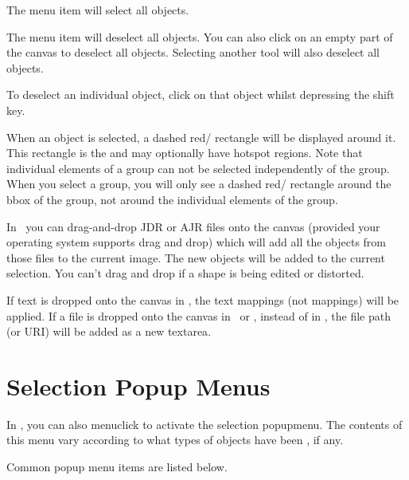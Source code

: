 The  menu item will select all
\glspl{object}.


The  menu item will deselect all
\glspl{object}. You can also click on
an empty part of the \gls{canvas} to deselect all \glspl{object}.
Selecting another tool will also deselect all \glspl*{object}.

\begin{information}
To deselect an individual \gls*{object}, click on that object whilst
depressing the shift  key.
\end{information}

When an \gls{object} is selected, a dashed red\slash{}
rectangle will be displayed around it. This rectangle is the 
\emph{} and may optionally have
\gls{hotspot} regions. Note that individual elements of a
\gls{group} can not be selected independently of the group.  When
you select a group, you will only see a dashed
red\slash{} rectangle around the \gls{bbox} of the group,
not around the individual elements of the group.

In \selectmode\ you can \gls{drag-and-drop} \gls{JDR} or \gls{AJR}
files onto the \gls{canvas} (provided your operating system supports
drag and drop) which will add all the objects from those files to
the current image. The new objects will be added to the current
selection. You can't drag and drop if a shape is being edited or
distorted.

If text is dropped onto the \gls{canvas} in \selectmode, the text
mappings (not  mappings) will be applied. If a file is
dropped onto the \gls{canvas} in \textmode\ or \mathsmode, instead of
in \selectmode, the file path (or URI) will be added as a new \gls{textarea}.

\section{Selection Popup Menus}
\label{sec:selectpopups}

In \selectmode, you can also \gls{menuclick} to activate the
selection \gls{popupmenu}. The contents of this menu vary according to
what types of \glspl*{object} have been \selected, if any.



Common popup menu items are listed below.

